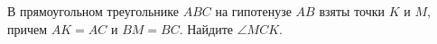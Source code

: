 \begin{ex}
	\begin{condition}
		В прямоугольном треугольнике \( ABC  \) на гипотенузе \( AB  \) взяты точки \( K  \) и \( M  \), причем \( AK = AC  \) и \( BM = BC \).
		Найдите \( \angle MCK \).
	\end{condition}
	\answer{\( 45\degree \)}
\end{ex}
